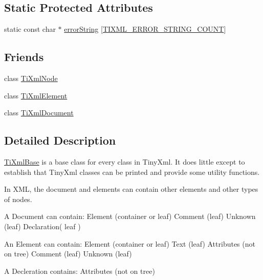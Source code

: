 \subsection*{Static Protected Attributes}
\begin{DoxyCompactItemize}
\item 
static const char $\ast$ \hyperlink{class_ti_xml_base_aea4b8bd0d25d5de9174c1ed5ea106dff}{error\-String} \mbox{[}\hyperlink{class_ti_xml_base_a0ece57ce1f3253db59ce82377c75c295a14552894942250efcec6b00dc52fc48a}{T\-I\-X\-M\-L\-\_\-\-E\-R\-R\-O\-R\-\_\-\-S\-T\-R\-I\-N\-G\-\_\-\-C\-O\-U\-N\-T}\mbox{]}
\end{DoxyCompactItemize}
\subsection*{Friends}
\begin{DoxyCompactItemize}
\item 
class \hyperlink{class_ti_xml_base_a218872a0d985ae30e78c55adc4bdb196}{Ti\-Xml\-Node}
\item 
class \hyperlink{class_ti_xml_base_ab6592e32cb9132be517cc12a70564c4b}{Ti\-Xml\-Element}
\item 
class \hyperlink{class_ti_xml_base_a173617f6dfe902cf484ce5552b950475}{Ti\-Xml\-Document}
\end{DoxyCompactItemize}


\subsection{Detailed Description}
\hyperlink{class_ti_xml_base}{Ti\-Xml\-Base} is a base class for every class in Tiny\-Xml. It does little except to establish that Tiny\-Xml classes can be printed and provide some utility functions.

In X\-M\-L, the document and elements can contain other elements and other types of nodes.

\begin{DoxyVerb}A Document can contain: Element (container or leaf)
                        Comment (leaf)
                        Unknown (leaf)
                        Declaration( leaf )

An Element can contain: Element (container or leaf)
                        Text    (leaf)
                        Attributes (not on tree)
                        Comment (leaf)
                        Unknown (leaf)

A Decleration contains: Attributes (not on tree)
\end{DoxyVerb}
 


